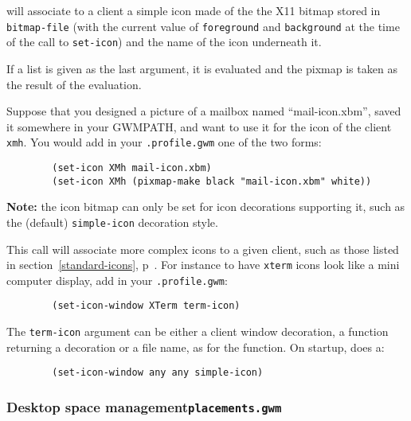\begin{description}
 \label{set-icon}
will associate to a client a simple icon made of the the X11 bitmap stored
in \verb"bitmap-file" (with the current value of \verb"foreground" and
\verb"background" at the time of the call to \verb"set-icon") and the name
of the icon underneath it. 

If a list is given as the last argument, it is evaluated and the pixmap is
taken as the result of the evaluation.

Suppose that you designed a picture of a mailbox named ``mail-icon.xbm'',
saved it somewhere in your GWMPATH, and want to use it for the icon of the
client \verb"xmh". You would add in your \verb".profile.gwm" one of the two
forms:

{\exemplefont\begin{verbatim}
        (set-icon XMh mail-icon.xbm)
        (set-icon XMh (pixmap-make black "mail-icon.xbm" white))
\end{verbatim}}

{\bf Note:} the icon bitmap can only be set for icon decorations
supporting it, such as the (default) \verb"simple-icon" decoration style.

\label{set-icon-window} This
call will associate more complex icons to a given client, such as those
listed in section~\ref{standard-icons}, p~\pageref{standard-icons}. For
instance to have \verb"xterm" icons look like a mini computer display, add
in your \verb".profile.gwm":

{\exemplefont\begin{verbatim}
        (set-icon-window XTerm term-icon)
\end{verbatim}}

The \verb"term-icon" argument can be either a client window decoration, a
function returning a decoration or a file name, as for the 
function. On startup, {\GWM} does a:

{\exemplefont\begin{verbatim}
        (set-icon-window any any simple-icon)
\end{verbatim}}

\end{description}

\subsubsection{Desktop space management\hfil{\tt placements.gwm}}

